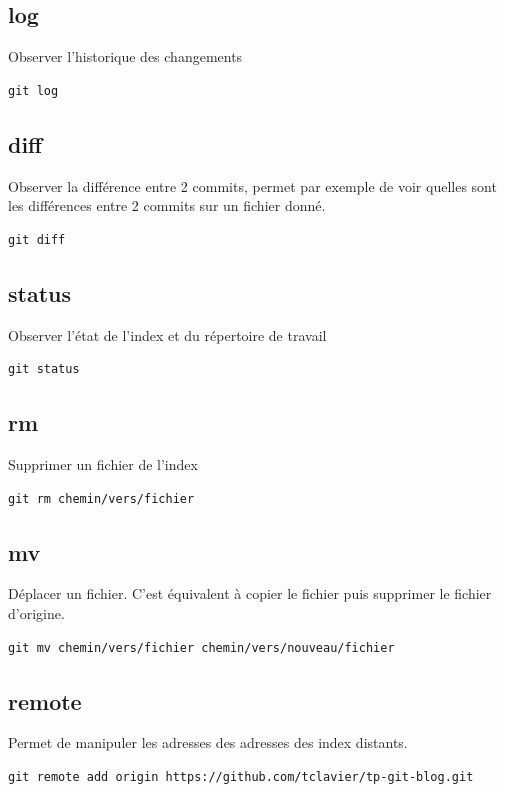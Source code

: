 \documentclass[a4paper]{article}
\begin{document}
\subsection*{log}
Observer l'historique des changements
\begin{verbatim}
git log
\end{verbatim}

\subsection*{diff}
Observer la différence entre 2 commits, permet par exemple de voir quelles sont les différences entre 2 commits sur un fichier donné.

\begin{verbatim}
git diff
\end{verbatim}

\subsection*{status}
Observer l'état de l'index et du répertoire de travail
\begin{verbatim}
git status
\end{verbatim}

\subsection*{rm}
Supprimer un fichier de l'index
\begin{verbatim}
git rm chemin/vers/fichier
\end{verbatim}

\subsection*{mv}
Déplacer un fichier. C'est équivalent à copier le fichier puis supprimer le fichier d'origine.
\begin{verbatim}
git mv chemin/vers/fichier chemin/vers/nouveau/fichier
\end{verbatim}

\subsection*{remote}
Permet de manipuler les adresses des adresses des index distants.
\begin{verbatim}
git remote add origin https://github.com/tclavier/tp-git-blog.git
\end{verbatim}
\end{document}
